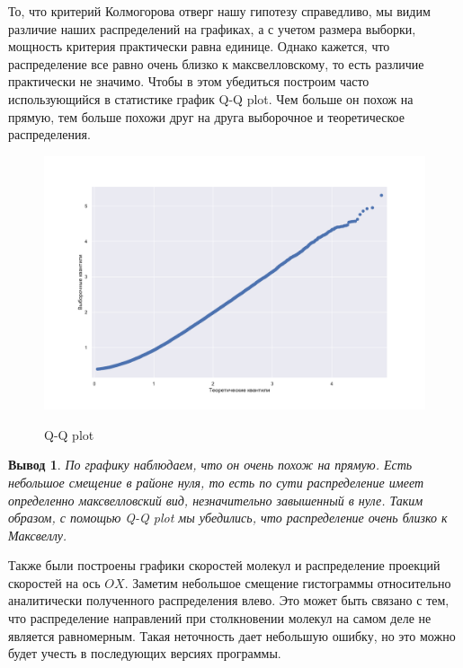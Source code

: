 \documentclass[twoside,twocolumn, 11pt]{article}
\theoremstyle{plain}
\newtheorem{conclusion}{Вывод}
\theoremstyle{definition}
\begin{document}
\indent То, что критерий Колмогорова отверг нашу гипотезу справедливо, мы видим различие наших распределений на графиках, а с учетом размера выборки, мощность критерия практически равна единице.
Однако кажется, что распределение все равно очень близко к максвелловскому, то есть различие практически не значимо. Чтобы в этом убедиться построим часто использующийся в статистике график Q-Q plot. Чем больше он похож на прямую, тем больше похожи друг на друга выборочное и теоретическое распределения.
\begin{figure}[!h]
{\includegraphics[width=1\linewidth]{qqplot}}
\caption{Q-Q plot}
\end{figure}


\begin{conclusion}
По графику наблюдаем, что он очень похож на прямую. Есть небольшое смещение в районе нуля, то есть по сути распределение имеет определенно максвелловский вид, незначительно завышенный в нуле.
Таким образом, с помощью Q-Q plot мы убедились, что распределение очень близко к Максвеллу.
\end{conclusion}

Также были построены графики скоростей молекул и распределение проекций скоростей на ось $OX$. Заметим небольшое смещение гистограммы относительно аналитически полученного распределения влево. Это может быть связано с тем, что распределение направлений при столкновении молекул на самом деле не является равномерным. Такая неточность дает небольшую ошибку, но это можно будет учесть в последующих версиях программы.
\end{document}
